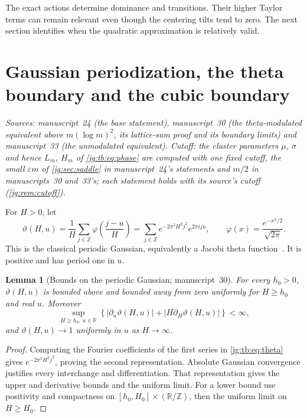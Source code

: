 \documentclass[11pt,a4paper]{article}
\newtheorem{lemma}[lemma]{Lemma}
\theoremstyle{definition}\newaliascnt{definition}{theorem}
\theoremstyle{remark}\newaliascnt{remark}{theorem}
\newcommand{\R}{\mathbb R}
\begin{document}
The exact actions determine dominance and transitions. Their higher Taylor terms
can remain relevant even though the centering tilts tend to zero. The next
section identifies when the quadratic approximation is relatively valid.

\section{Gaussian periodization, the theta boundary and the cubic boundary}
\label{jg:sec:gauss}
\emph{Sources: manuscript~24 (the base statement), manuscript~30 (the
theta-modulated equivalent above $m(\log m)^2$, its lattice-sum proof and its
boundary limits) and manuscript~33 (the unmodulated equivalent). Cutoff: the
cluster parameters $\mu$, $\sigma$ and hence $L_m$, $H_m$ of
\eqref{jg:tb:eq:phase} are computed with one fixed cutoff, the small
$\varepsilon m$ of \cref{jg:sec:saddle} in manuscript~24's statements and $m/2$
in manuscripts~30 and~33's; each statement holds with its source's cutoff
(\cref{jg:rem:cutoff}).}

For $H>0$, let
\begin{equation}\label{jg:tb:eq:theta}
 \vartheta(H,u)
 =\frac1H\sum_{j\in\mathbb Z}\varphi\!\left(\frac{j-u}{H}\right)
 =\sum_{j\in\mathbb Z}e^{-2\pi^2H^2j^2}e^{2\pi iju},
 \qquad \varphi(x)=\frac{e^{-x^2/2}}{\sqrt{2\pi}}.
\end{equation}
This is the classical periodic Gaussian, equivalently a Jacobi theta
function~\cite{jg:DLMF}. It is positive and has period one in $u$.

\begin{lemma}[Bounds on the periodic Gaussian; manuscript~30]
\label{jg:tb:lem:theta}
For every $h_0>0$, $\vartheta(H,u)$ is bounded above and bounded away from zero
uniformly for $H\ge h_0$ and real $u$. Moreover
\begin{equation}\label{jg:tb:eq:deriv}
 \sup_{H\ge h_0,\ u\in\R}
 \left\{|\partial_u\vartheta(H,u)|+
               |H\partial_H\vartheta(H,u)|\right\}<\infty,
\end{equation}
and $\vartheta(H,u)\to1$ uniformly in $u$ as $H\to\infty$.
\end{lemma}
\begin{proof}
Computing the Fourier coefficients of the first series in
\eqref{jg:tb:eq:theta} gives $e^{-2\pi^2H^2j^2}$, proving the second
representation. Absolute Gaussian convergence justifies every interchange and
differentiation. That representation gives the upper and derivative bounds and
the uniform limit. For a lower bound use positivity and compactness on
$[h_0,H_0]\times(\R/\mathbb Z)$, then the uniform limit on $H\ge H_0$.
\end{proof}
\end{document}
